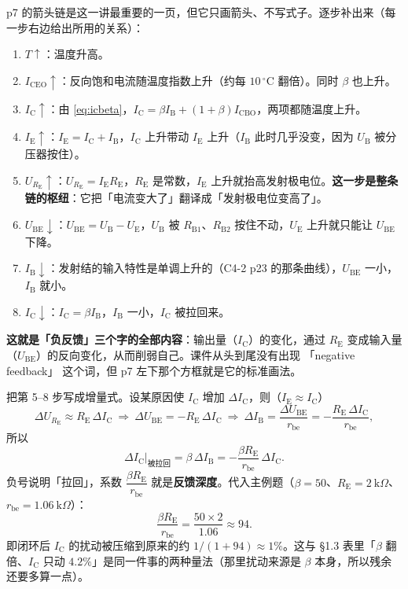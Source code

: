 \documentclass[11pt]{ctexart}
\newcommand{\UBE}{U_{\mathrm{BE}}}
\newcommand{\UB}{U_{\mathrm{B}}}
\newcommand{\UE}{U_{\mathrm{E}}}
\newcommand{\IB}{I_{\mathrm{B}}}
\newcommand{\IC}{I_{\mathrm{C}}}
\newcommand{\IE}{I_{\mathrm{E}}}
\newcommand{\RBone}{R_{\mathrm{B1}}}
\newcommand{\RBtwo}{R_{\mathrm{B2}}}
\newcommand{\RE}{R_{\mathrm{E}}}
\newcommand{\rbe}{r_{\mathrm{be}}}
\newcommand{\ICBO}{I_{\mathrm{CBO}}}
\newcommand{\ICEO}{I_{\mathrm{CEO}}}
\begin{document}

p7 的箭头链是这一讲最重要的一页，但它只画箭头、不写式子。逐步补出来（每一步右边给出所用的关系）：

\begin{enumerate}
\item $T\uparrow$：温度升高。
\item $\ICEO\uparrow$：反向饱和电流随温度指数上升（约每 $10\,^{\circ}\mathrm{C}$ 翻倍）。同时 $\beta$ 也上升。
\item $\IC\uparrow$：由 \eqref{eq:icbeta}，$\IC=\beta\IB+(1+\beta)\ICBO$，两项都随温度上升。
\item $\IE\uparrow$：$\IE=\IC+\IB$，$\IC$ 上升带动 $\IE$ 上升（$\IB$ 此时几乎没变，因为 $\UB$ 被分压器按住）。
\item $U_{\RE}\uparrow$：$U_{\RE}=\IE\RE$，$\RE$ 是常数，$\IE$ 上升就抬高发射极电位。\textbf{这一步是整条链的枢纽}：它把「电流变大了」翻译成「发射极电位变高了」。
\item $\UBE\downarrow$：$\UBE=\UB-\UE$，$\UB$ 被 $\RBone$、$\RBtwo$ 按住不动，$\UE$ 上升就只能让 $\UBE$ 下降。
\item $\IB\downarrow$：发射结的输入特性是单调上升的（C4-2 p23 的那条曲线），$\UBE$ 一小，$\IB$ 就小。
\item $\IC\downarrow$：$\IC=\beta\IB$，$\IB$ 一小，$\IC$ 被拉回来。
\end{enumerate}

\textbf{这就是「负反馈」三个字的全部内容}：输出量（$\IC$）的变化，通过 $\RE$ 变成输入量（$\UBE$）的反向变化，从而削弱自己。课件从头到尾没有出现 「negative feedback」 这个词，但 p7 左下那个方框就是它的标准画法。


把第 5--8 步写成增量式。设某原因使 $\IC$ 增加 $\Delta\IC$，则（$\IE\approx\IC$）
\[ \Delta U_{\RE}\approx\RE\,\Delta\IC\ \Longrightarrow\ \Delta\UBE=-\RE\,\Delta\IC\ \Longrightarrow\ \Delta\IB=\frac{\Delta\UBE}{\rbe}=-\frac{\RE\,\Delta\IC}{\rbe} , \]
所以
\[ \Delta\IC\big|_{\text{被拉回}}=\beta\,\Delta\IB=-\frac{\beta\RE}{\rbe}\,\Delta\IC . \]
负号说明「拉回」，系数 $\dfrac{\beta\RE}{\rbe}$ 就是\textbf{反馈深度}。代入主例题（$\beta=50$、$\RE=2\ \mathrm{k}\Omega$、$\rbe=1.06\ \mathrm{k}\Omega$）：
\[ \frac{\beta\RE}{\rbe}=\frac{50\times2}{1.06}\approx94 . \]
即闭环后 $\IC$ 的扰动被压缩到原来的约 $1/(1+94)\approx1\%$。这与 §1.3 表里「$\beta$ 翻倍、$\IC$ 只动 $4.2\%$」是同一件事的两种量法（那里扰动来源是 $\beta$ 本身，所以残余还要多算一点）。
\end{document}
